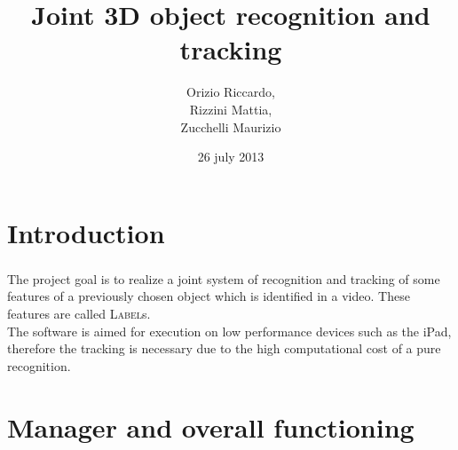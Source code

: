 \documentclass{beamer}
\title{Joint 3D object recognition and tracking}
\author[Orizio, Rizzini, Zucchelli]{Orizio Riccardo,\\Rizzini Mattia,\\Zucchelli Maurizio}
\date{26 july 2013}
\institute[UniBS]{University of Brescia}
\begin{document}
  \begin{frame}
    \maketitle
  \end{frame}

  \section{Introduction}
  
  \begin{frame}
    \frametitle{\insertsection}
    The project goal is to realize a joint system of recognition and tracking
    of some features of a previously chosen object which is identified in a
    video.  These features are called \textsc{Label}s.\\
    The software is aimed for execution on low performance devices such as the
    iPad, therefore the tracking is necessary due to the high computational
    cost of a pure recognition.\\
  \end{frame}


  \section{Manager and overall functioning}
\end{document}
